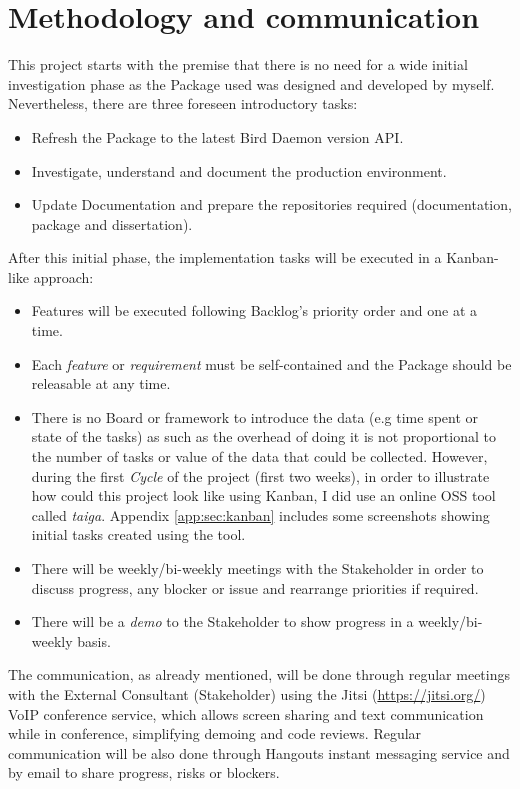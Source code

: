 \section{Methodology and communication}
This project starts with the premise that there is no need for a wide initial investigation phase as the Package used was designed and developed by myself. Nevertheless, there are three foreseen introductory tasks:
\begin{itemize}
    \item Refresh the Package to the latest Bird Daemon version API. 
    \item Investigate, understand and document the production environment.
    \item Update Documentation and prepare the repositories required (documentation, package and dissertation).
\end{itemize}

After this initial phase, the implementation tasks will be executed in a Kanban-like approach:
\begin{itemize}
    \item Features will be executed following Backlog's priority order and one at a time.
    \item Each \textit{feature} or \textit{requirement} must be self-contained and the Package should be releasable at any time.
    \item There is no Board or framework to introduce the data (e.g time spent or state of the tasks) as such as the overhead of doing it is not proportional to the number of tasks or value of the data that could be collected. However, during the first \textit{Cycle} of the project (first two weeks), in order to illustrate how could this project look like using Kanban, I did use an online OSS tool called \textit{\Gls{taiga}}. Appendix \ref{app:sec:kanban} includes some screenshots  showing initial tasks created using the tool.
    \item There will be weekly/bi-weekly meetings with the Stakeholder in order to discuss progress, any blocker or issue and rearrange priorities if required.
    \item There will be a \textit{demo} to the Stakeholder to show progress in a weekly/bi-weekly basis.
\end{itemize}

The communication, as already mentioned, will be done through regular meetings with the External Consultant (Stakeholder) using the Jitsi (\href{https://jitsi.org/}{https://jitsi.org/}) VoIP conference service, which allows screen sharing and text communication while in conference, simplifying demoing and code reviews. Regular communication will be also done through Hangouts instant messaging service and by email to share progress, risks or blockers.


